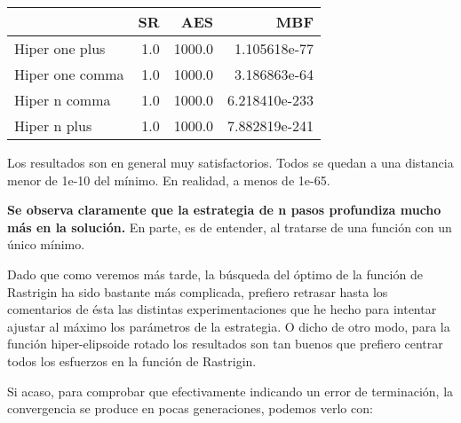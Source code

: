 \documentclass[11pt]{article}
\begin{document}
    \begin{tabular}{lrrr}
\toprule
{} &   SR &     AES &            MBF \\
\midrule
Hiper one plus  &  1.0 &  1000.0 &   1.105618e-77 \\
Hiper one comma &  1.0 &  1000.0 &   3.186863e-64 \\
Hiper n   comma &  1.0 &  1000.0 &  6.218410e-233 \\
Hiper n   plus  &  1.0 &  1000.0 &  7.882819e-241 \\
\bottomrule
\end{tabular}

    

    \[ \] Los resultados son en general muy satisfactorios. Todos se quedan
a una distancia menor de 1e-10 del mínimo. En realidad, a menos de
1e-65.

\textbf{Se observa claramente que la estrategia de n pasos profundiza
mucho más en la solución.} En parte, es de entender, al tratarse de una
función con un único mínimo.

Dado que como veremos más tarde, la búsqueda del óptimo de la función de
Rastrigin ha sido bastante más complicada, prefiero retrasar hasta los
comentarios de ésta las distintas experimentaciones que he hecho para
intentar ajustar al máximo los parámetros de la estrategia. O dicho de
otro modo, para la función hiper-elipsoide rotado los resultados son tan
buenos que prefiero centrar todos los esfuerzos en la función de
Rastrigin.

Si acaso, para comprobar que efectivamente indicando un error de
terminación, la convergencia se produce en pocas generaciones, podemos
verlo con:
\end{document}
